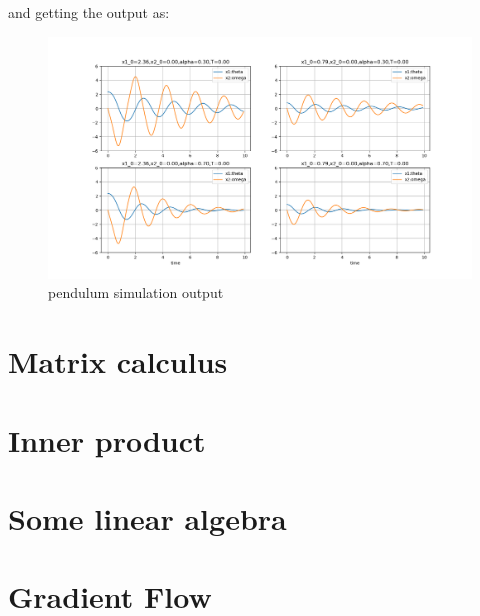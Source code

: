 \documentclass[titlepage]{article}
\begin{document}
and getting the output as:
\begin{figure}[htbp]
    \centering
    \includegraphics[width=\textwidth]{img/pendulumSim.png}
    \caption{pendulum simulation output}
    \label{fig:pendulumSim}
\end{figure}

\section{Matrix calculus}
\section{Inner product}
\section{Some linear algebra}
\section{Gradient Flow}
\end{document}
